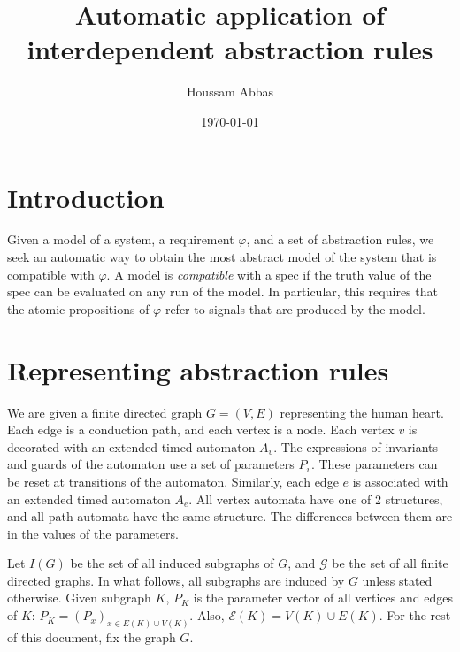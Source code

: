 \documentclass[11pt, oneside, reqno]{article}
\newcommand{\Gc}{\mathcal{G}}
\newcommand{\Ic}{\mathcal{I}}
\newcommand{\Ec}{\mathcal{E}}
\begin{document}
\title{Automatic application of interdependent abstraction rules}
\author{Houssam Abbas}
\date{\today}
\maketitle


\section{Introduction}
Given a model of a system, a requirement $\varphi$, and a set of abstraction rules, we seek an automatic way to obtain the most abstract model of the system that is compatible with $\varphi$.
A model is \emph{compatible} with a spec if the truth value of the spec can be evaluated on any run of the model.
In particular, this requires that the atomic propositions of $\varphi$ refer to signals that are produced by the model.

\section{Representing abstraction rules}
We are given a finite directed graph $G=(V,E)$ representing the human heart. 
Each edge is a conduction path, and each vertex is a node.
Each vertex $v$ is decorated with an extended timed automaton $A_v$.
The expressions of invariants and guards of the automaton use a set of parameters $P_v$. 
These parameters can be reset at transitions of the automaton.
Similarly, each edge $e$ is associated with an extended timed automaton $A_e$.
All vertex automata have one of 2 structures, and all path automata have the same structure. 
The differences between them are in the values of the parameters.

Let $I(G)$ be the set of all induced subgraphs of $G$, and $\Gc$ be the set of all finite directed graphs.
In what follows, all subgraphs are induced by $G$ unless stated otherwise.
Given subgraph $K$, $P_K$ is the parameter vector of all vertices and edges of $K$: $P_K = (P_x)_{x \in E(K) \cup V(K)}$.
Also, $\Ec(K) = V(K) \cup E(K)$.
For the rest of this document, fix the graph $G$.
\end{document}
